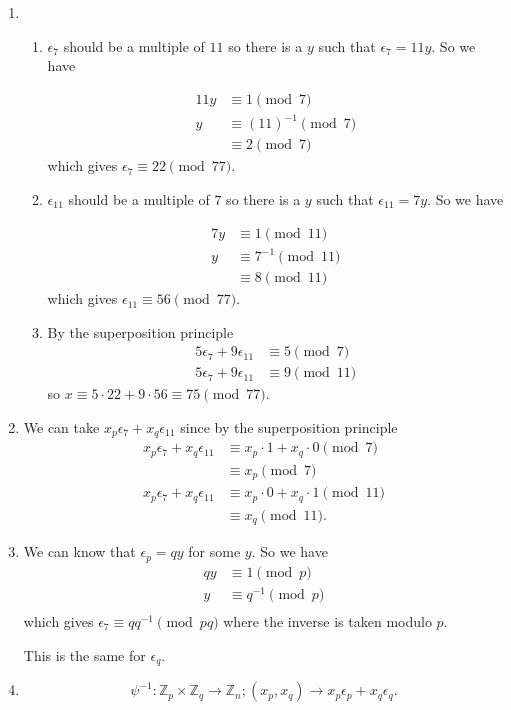 \begin{solution}
	\begin{enumerate}
		\item
		\begin{enumerate}
			\item
			$\epsilon_7$ should be a multiple of $11$ so there is a $y$ such
			that $\epsilon_7 = 11y$.
			So we have
			
			\begin{align*}
				11y & \equiv 1 \pmod{7}\\
				y & \equiv (11)^{-1} \pmod{7}\\
				& \equiv 2 \pmod{7}
			\end{align*}
			which gives $\epsilon_7 \equiv 22 \pmod{77}$.
			\item
			$\epsilon_{11}$ should be a multiple of $7$ so there is a $y$ such
			that $\epsilon_{11} = 7y$.
			So we have
			
			\begin{align*}
				7y & \equiv 1 \pmod{11}\\
				y & \equiv 7^{-1} \pmod{11}\\
				& \equiv 8 \pmod{11}
			\end{align*}
			which gives $\epsilon_{11} \equiv 56 \pmod{77}$.
			\item
			By the superposition principle
			\begin{align*}
				5\epsilon_7 + 9\epsilon_{11} & \equiv 5 \pmod{7}\\
				5\epsilon_7 + 9\epsilon_{11} & \equiv 9 \pmod{11}
			\end{align*}
			so $x \equiv 5 \cdot 22 + 9 \cdot 56 \equiv 75 \pmod{77}$.
		\end{enumerate}
		\item
		We can take $x_p\epsilon_7 + x_q\epsilon_{11}$
		since by the superposition principle
		\begin{align*}
			x_p\epsilon_7 + x_q\epsilon_{11} & \equiv x_p \cdot 1 + x_q \cdot 0 \pmod{7}\\
			& \equiv x_p \pmod{7}\\
			x_p\epsilon_7 + x_q\epsilon_{11} & \equiv x_p \cdot 0 + x_q \cdot 1 \pmod{11}\\
			& \equiv x_q \pmod{11}.
		\end{align*}
		\item
		We can know that $\epsilon_p = qy$ for some $y$.
		So we have
		\begin{align*}
			qy & \equiv 1 \pmod{p}\\
			y & \equiv q^{-1} \pmod{p}\\
		\end{align*}
		which gives $\epsilon_7 \equiv qq^{-1} \pmod{pq}$
		where the inverse is taken modulo $p$.
		
		This is the same for $\epsilon_q$.
		\item
		\[ \psi^{-1} : \mathbb{Z}_p \times \mathbb{Z}_q \to \mathbb{Z}_n; (x_p, x_q) \to x_p\epsilon_p + x_q\epsilon_q. \]
	\end{enumerate}
\end{solution}


